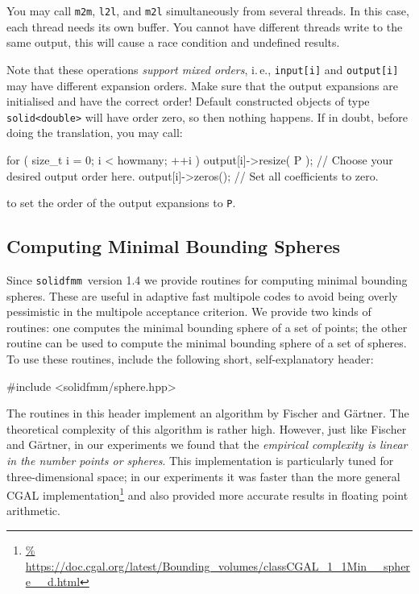\documentclass{scrbook}
\newcommand{\solidfmm}{\texttt{solidfmm}}
\begin{document}
You may call \lstinline|m2m|, \lstinline|l2l|, and \lstinline|m2l|
simultaneously from several threads. In this case, each thread needs its own
buffer. You cannot have different threads  write to the same output, this will
cause a race condition and undefined results.

Note that these operations \emph{support mixed orders}, i.\,e.,
\lstinline|input[i]| and \lstinline|output[i]| may have different expansion
orders. Make sure that the output expansions are initialised and have the
correct order! Default constructed objects of type \lstinline|solid<double>|
will have order zero, so then nothing happens. If in doubt, before doing the
translation, you may call:
\begin{cppcode*}
for ( size_t i = 0; i < howmany; ++i )
{
    output[i]->resize( P ); // Choose your desired output order here.
    output[i]->zeros();     // Set all coefficients to zero.
}
\end{cppcode*}
to set the order of the output expansions to \lstinline|P|.

\subsection{Computing Minimal Bounding Spheres}
Since \solidfmm\ version 1.4 we provide routines for computing minimal bounding
spheres. These are useful in adaptive fast multipole codes to avoid being
overly pessimistic in the multipole acceptance criterion. We provide
two kinds of routines: one computes the minimal bounding sphere of a set 
of points; the other routine can be used to compute the minimal bounding sphere
of a set of spheres. To use these routines, include the following
short, self-explanatory header:
\begin{cppcode*}
#include <solidfmm/sphere.hpp>
\end{cppcode*}

The routines in this header implement an algorithm by Fischer and
Gärtner.\autocite{fischer2004} The theoretical complexity of this algorithm is
rather high. However, just like Fischer and Gärtner, in our experiments we
found that the \emph{empirical complexity is linear in the number points or
spheres}. This implementation is particularly tuned for three-dimensional
space; in our experiments it was faster than the more general CGAL
implementation\footnote{\url{%
https://doc.cgal.org/latest/Bounding_volumes/classCGAL_1_1Min__sphere__d.html}}
and also provided more accurate results in floating point arithmetic.
\end{document}
